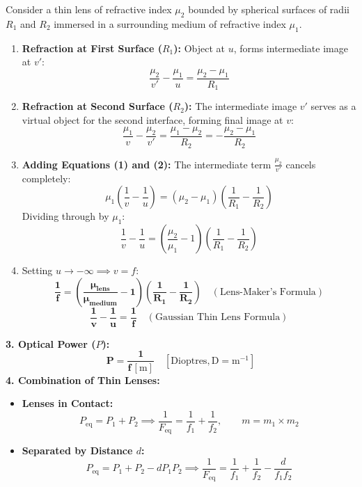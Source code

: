 \documentclass[10pt,twoside,openright]{book}
\begin{document}
\begin{formulabox}
Consider a thin lens of refractive index $\mu_2$ bounded by spherical surfaces of radii $R_1$ and $R_2$ immersed in a surrounding medium of refractive index $\mu_1$.
\begin{enumerate}
  \item \textbf{Refraction at First Surface ($R_1$):} Object at $u$, forms intermediate image at $v'$:
  \begin{equation}
    \frac{\mu_2}{v'} - \frac{\mu_1}{u} = \frac{\mu_2 - \mu_1}{R_1} \tag{Eq. 1}
  \end{equation}
  \item \textbf{Refraction at Second Surface ($R_2$):} The intermediate image $v'$ serves as a virtual object for the second interface, forming final image at $v$:
  \begin{equation}
    \frac{\mu_1}{v} - \frac{\mu_2}{v'} = \frac{\mu_1 - \mu_2}{R_2} = -\frac{\mu_2 - \mu_1}{R_2} \tag{Eq. 2}
  \end{equation}
  \item \textbf{Adding Equations (1) and (2):} The intermediate term $\frac{\mu_2}{v'}$ cancels completely:
  \begin{equation}
    \mu_1 \left(\frac{1}{v} - \frac{1}{u}\right) = (\mu_2 - \mu_1)\left(\frac{1}{R_1} - \frac{1}{R_2}\right)
  \end{equation}
  Dividing through by $\mu_1$:
  \begin{equation}
    \frac{1}{v} - \frac{1}{u} = \left(\frac{\mu_2}{\mu_1} - 1\right)\left(\frac{1}{R_1} - \frac{1}{R_2}\right)
  \end{equation}
  \item Setting $u \to -\infty \implies v = f$:
  \begin{equation}
    \mathbf{\frac{1}{f} = \left(\frac{\mu_{\text{lens}}}{\mu_{\text{medium}}} - 1\right)\left(\frac{1}{R_1} - \frac{1}{R_2}\right)} \quad (\text{Lens-Maker's Formula})
  \end{equation}
  \begin{equation}
    \mathbf{\frac{1}{v} - \frac{1}{u} = \frac{1}{f}} \quad (\text{Gaussian Thin Lens Formula})
  \end{equation}
\end{enumerate}
\textbf{3. Optical Power ($P$):}
\begin{equation}
  \mathbf{P = \frac{1}{f\,[\mathrm{m}]}} \quad [\mathrm{Dioptres}, \mathrm{D} = \mathrm{m}^{-1}]
\end{equation}
\textbf{4. Combination of Thin Lenses:}
\begin{itemize}[leftmargin=1.2em, itemsep=2pt]
  \item \textbf{Lenses in Contact:}
  \[
    P_{\text{eq}} = P_1 + P_2 \implies \frac{1}{F_{\text{eq}}} = \frac{1}{f_1} + \frac{1}{f_2}, \qquad m = m_1 \times m_2
  \]
  \item \textbf{Separated by Distance $d$:}
  \[
    P_{\text{eq}} = P_1 + P_2 - d P_1 P_2 \implies \frac{1}{F_{\text{eq}}} = \frac{1}{f_1} + \frac{1}{f_2} - \frac{d}{f_1 f_2}
  \]
\end{itemize}
\end{formulabox}
\end{document}
